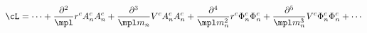 \begin{equation}
\cL = 
\cdots + 
\frac{\partial^2}{\mpl} r^c A^c_n A^c_n + 
\frac{\partial^3}{\mpl m_n} V^c A^c_n A^c_n +
\frac{\partial^4}{\mpl m_n^2} r^c \Phi^c_n \Phi^c_n +
\frac{\partial^5}{\mpl m_n^3} V^c \Phi_n^c \Phi_n^c +
\cdots \label{rvint}
\end{equation} 
